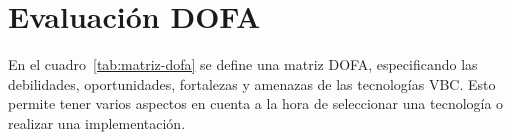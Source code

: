 \section{Evaluación DOFA}
En el cuadro~\ref{tab:matriz-dofa} se define una matriz DOFA, especificando las debilidades, oportunidades, fortalezas y amenazas de las tecnologías VBC. Esto permite tener varios aspectos en cuenta a la hora de seleccionar una tecnología o realizar una implementación.

